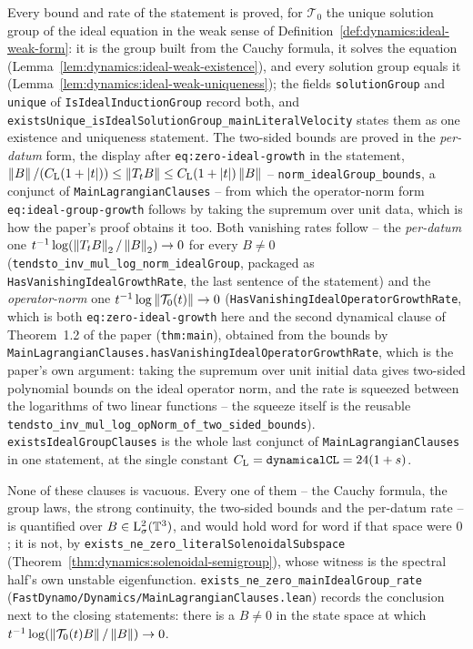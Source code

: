 Every bound and rate of the statement is proved, for $\mathcal T_0$ the unique solution group
of the ideal equation in the weak sense of Definition~\ref{def:dynamics:ideal-weak-form}: it is
the group built from the Cauchy formula, it solves the equation
(Lemma~\ref{lem:dynamics:ideal-weak-existence}), and every solution group equals it
(Lemma~\ref{lem:dynamics:ideal-weak-uniqueness}); the fields \texttt{solutionGroup} and
\texttt{unique} of \texttt{IsIdealInductionGroup} record both, and
\texttt{existsUnique\_isIdealSolutionGroup\_mainLiteralVelocity} states them as one existence
and uniqueness statement.  The two-sided bounds are proved in the
\emph{per-datum} form, the display after \texttt{eq:zero-ideal-growth} in the statement,
$\left\|B\right\|/(C_{\rm L}(1+\left\lvert t\right\rvert))\leq\left\|T_tB\right\|\leq C_{\rm L}(1+\left\lvert t\right\rvert)\left\|B\right\|$
-- \texttt{norm\_idealGroup\_bounds}, a conjunct of \texttt{MainLagrangianClauses} -- from
which the operator-norm form \texttt{eq:ideal-group-growth} follows by taking the supremum
over unit data, which is how the paper's proof obtains it too.  Both vanishing rates follow
-- the \emph{per-datum} one
$t^{-1}\log(\left\|T_tB\right\|_2/\left\|B\right\|_2)\to0$ for every $B\neq0$
(\texttt{tendsto\_inv\_mul\_log\_norm\_idealGroup}, packaged as
\texttt{HasVanishingIdealGrowthRate}, the last sentence of the statement)
and the \emph{operator-norm} one $t^{-1}\log\left\|\mathcal T_0(t)\right\|\to0$
(\texttt{HasVanishingIdealOperatorGrowthRate}, which is both \texttt{eq:zero-ideal-growth}
here and the second dynamical clause of Theorem~1.2 of the paper (\texttt{thm:main}),
obtained from the bounds by
\texttt{MainLagrangianClauses.hasVanishingIdealOperatorGrowthRate}, which is the paper's
own argument: taking the supremum over unit initial data gives two-sided polynomial bounds
on the ideal operator norm, and the rate is squeezed between the logarithms of two linear
functions -- the squeeze itself is the reusable
\texttt{tendsto\_inv\_mul\_log\_opNorm\_of\_two\_sided\_bounds}).
\texttt{existsIdealGroupClauses} is the whole last conjunct of
\texttt{MainLagrangianClauses} in one statement, at the single constant
$C_{\rm L}=\texttt{dynamicalCL}=24(1+s)$.

None of these clauses is vacuous.  Every one of them -- the Cauchy formula, the group laws,
the strong continuity, the two-sided bounds and the per-datum rate -- is quantified over
$B\in\mathrm{L}^2_\sigma(\mathbb{T}^3) $, and would hold word for word if that space were $0 $; it is not,
by \texttt{exists\_ne\_zero\_literalSolenoidalSubspace}
(Theorem~\ref{thm:dynamics:solenoidal-semigroup}), whose witness is the spectral half's own
unstable eigenfunction.  \texttt{exists\_ne\_zero\_mainIdealGroup\_rate}
(\texttt{FastDynamo/Dynamics/MainLagrangianClauses.lean}) records the conclusion next to the
closing statements: there is a $B\neq0 $ in the state space at which
$t^{-1}\log(\left\|\mathcal T_0(t)B\right\|/\left\|B\right\|)\to0 $.

